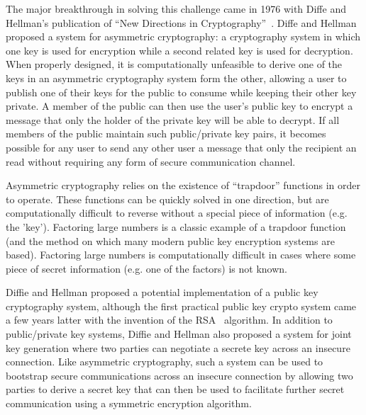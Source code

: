 \documentclass{sig-alternate}
\begin{document}
The major breakthrough in solving this challenge came in 1976 with
Diffe and Hellman's publication of ``New Directions in
Cryptography''~\cite{Diffie1976}. Diffe and Hellman proposed a system
for asymmetric cryptography: a cryptography system in which one key is
used for encryption while a second related key is used for
decryption. When properly designed, it is computationally unfeasible
to derive one of the keys in an asymmetric cryptography system form
the other, allowing a user to publish one of their keys for the public
to consume while keeping their other key private. A member of the
public can then use the user's public key to encrypt a message that
only the holder of the private key will be able to decrypt. If all
members of the public maintain such public/private key pairs, it
becomes possible for any user to send any other user a message that
only the recipient an read without requiring any form of secure
communication channel.

Asymmetric cryptography relies on the existence of ``trapdoor''
functions in order to operate. These functions can be quickly solved
in one direction, but are computationally difficult to reverse without
a special piece of information (e.g. the 'key'). Factoring large
numbers is a classic example of a trapdoor function (and the method on
which many modern public key encryption systems are based). Factoring
large numbers is computationally difficult in cases where some piece
of secret information (e.g. one of the factors) is not known.

Diffie and Hellman proposed a potential implementation of a public key
cryptography system, although the first practical public key crypto
system came a few years latter with the invention of the
RSA~\cite{Rivest1978} algorithm. In addition to public/private key
systems, Diffie and Hellman also proposed a system for joint key
generation where two parties can negotiate a secrete key across an
insecure connection. Like asymmetric cryptography, such a system can
be used to bootstrap secure communications across an insecure
connection by allowing two parties to derive a secret key that can
then be used to facilitate further secret communication using a
symmetric encryption algorithm.
\end{document}

